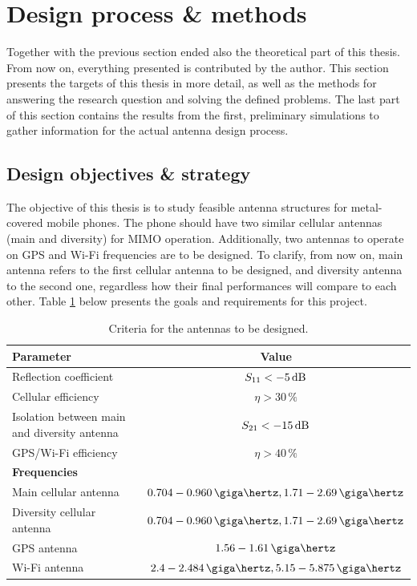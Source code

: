 \section{Design process \& methods}
\label{sec:objectives}
Together with the previous section ended also the theoretical part of this thesis. From now on, everything presented is contributed by the author. This section presents the targets of this thesis in more detail, as well as the methods for answering the research question and solving the defined problems. The last part of this section contains the results from the first, preliminary simulations to gather information for the actual antenna design process.

\subsection{Design objectives \& strategy}
\label{sec:strategy}
The objective of this thesis is to study feasible antenna structures for metal-covered mobile phones. The phone should have two similar cellular antennas (main and diversity) for MIMO operation. Additionally, two antennas to operate on GPS and Wi-Fi frequencies are to be designed. To clarify, from now on, main antenna refers to the first cellular antenna to be designed, and diversity antenna to the second one, regardless how their final performances will compare to each other. Table \ref{tab:design_goals} below presents the goals and requirements for this project.

\begin{table}[H]
    \centering
    \caption{Criteria for the antennas to be designed.}
    \label{tab:design_goals}
    \begin{tabular}{|l|c|}
        \hline
         \textbf{Parameter} & \textbf{Value} \\
         \hline
         Reflection coefficient & $S_{11} < -5\,\mathrm{dB}$\\
         \hline
         Cellular efficiency & $\eta > 30\,\%$\\
         \hline
         Isolation between main and diversity antenna & $S_{21} < -15\,\mathrm{dB}$\\
         \hline
         GPS/Wi-Fi efficiency & $\eta > 40\,\%$\\
         \hline\hline
         \textbf{Frequencies} & \\
         \hline
         Main cellular antenna & $0.704-0.960\,\giga\hertz, 1.71-2.69\,\giga\hertz$\\
         \hline
         Diversity cellular antenna & $0.704-0.960\,\giga\hertz, 1.71-2.69\,\giga\hertz$\\
         \hline
         GPS antenna & $1.56-1.61\,\giga\hertz$\\
         \hline
         Wi-Fi antenna & $2.4-2.484\,\giga\hertz, 5.15-5.875\,\giga\hertz$\\
         \hline
    \end{tabular}
\end{table}

